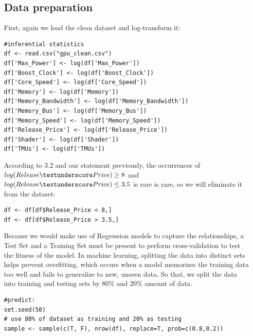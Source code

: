 \documentclass[a4paper]{article}
\let\le=\leq
\let\ge=\geq
\theoremstyle{definition}
\begin{document}
\subsection{Data preparation}
First, again we load the clean dataset and log-transform it:
\begin{mdframed}[leftline=false,rightline=false,backgroundcolor=lightblue!10,nobreak=false]
    \begin{verbatim}
#inferential statistics
df <- read.csv("gpu_clean.csv")
df['Max_Power'] <- log(df['Max_Power'])
df['Boost_Clock'] <- log(df['Boost_Clock'])
df['Core_Speed'] <- log(df['Core_Speed'])
df['Memory'] <- log(df['Memory'])
df['Memory_Bandwidth'] <- log(df['Memory_Bandwidth'])
df['Memory_Bus'] <- log(df['Memory_Bus'])
df['Memory_Speed'] <- log(df['Memory_Speed'])
df['Release_Price'] <- log(df['Release_Price'])
df['Shader'] <- log(df['Shader'])
df['TMUs'] <- log(df['TMUs'])
    \end{verbatim}
\end{mdframed}
According to 3.2 and our statement previously, the occurrences of $log(Release\textunderscore Price)\ge 8$ and $log(Release\textunderscore Price)\le 3.5$ is rare is rare, so we will eliminate it from the dataset:
\begin{mdframed}[leftline=false,rightline=false,backgroundcolor=lightblue!10,nobreak=false]
    \begin{verbatim}
df <- df[df$Release_Price < 8,]
df <- df[df$Release_Price > 3.5,]
    \end{verbatim}
\end{mdframed}
Because we would make use of Regression models to capture the relationships, a Test Set and a Training Set must be present to perform cross-validation to test the fitness of the model. In machine learning, splitting the data into distinct sets helps prevent overfitting, which occurs when a model memorizes the training data too well and fails to generalize to new, unseen data. So that, we split the data into training and testing sets by 80\% and 20\% amount of data.
\begin{mdframed}[leftline=false,rightline=false,backgroundcolor=lightblue!10,nobreak=false]
    \begin{verbatim}
#predict: 
set.seed(50)
# use 80% of dataset as training and 20% as testing
sample <- sample(c(T, F), nrow(df), replace=T, prob=c(0.8,0.2))
    \end{verbatim}
\end{mdframed}
\end{document}
